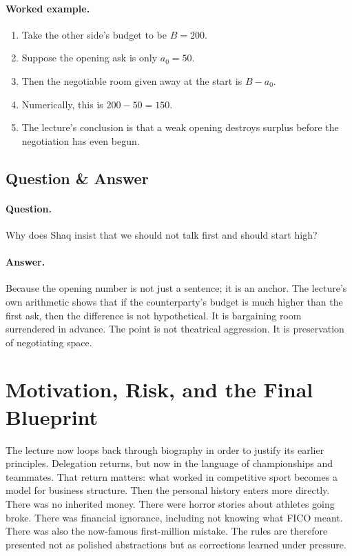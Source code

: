\paragraph{Worked example.}
\begin{enumerate}
\item Take the other side's budget to be \(B=200\).
\item Suppose the opening ask is only \(a_0=50\).
\item Then the negotiable room given away at the start is \(B-a_0\).
\item Numerically, this is \(200-50=150\).
\item The lecture's conclusion is that a weak opening destroys surplus before the negotiation has even begun.
\end{enumerate}

\subsection{Question \& Answer}

\paragraph{Question.} Why does Shaq insist that we should not talk first and should start high?

\paragraph{Answer.} Because the opening number is not just a sentence; it is an anchor. The lecture's own arithmetic shows that if the counterparty's budget is much higher than the first ask, then the difference is not hypothetical. It is bargaining room surrendered in advance. The point is not theatrical aggression. It is preservation of negotiating space.

\section{Motivation, Risk, and the Final Blueprint}

The lecture now loops back through biography in order to justify its earlier principles. Delegation returns, but now in the language of championships and teammates. That return matters: what worked in competitive sport becomes a model for business structure. Then the personal history enters more directly. There was no inherited money. There were horror stories about athletes going broke. There was financial ignorance, including not knowing what FICO meant. There was also the now-famous first-million mistake. The rules are therefore presented not as polished abstractions but as corrections learned under pressure.


